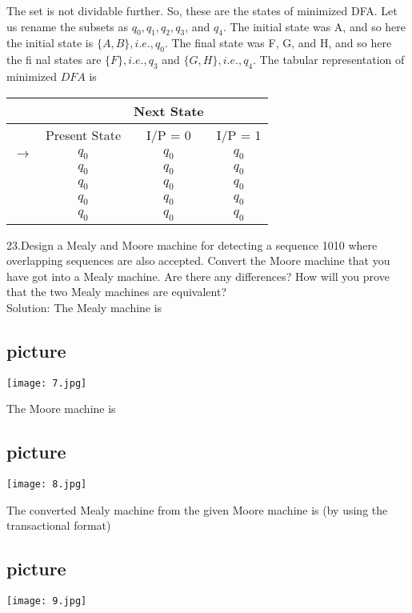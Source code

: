 \documentclass{article}
\begin{document}
The set is not dividable further. So, these are the states of minimized DFA. Let us rename the subsets as $q_0, q_1, q_2, q_3$, and $q_4$. The initial state was A, and so here the initial state is $\{A, B\}, i.e., q_0$. The ﬁnal state was F, G, and H, and so here the ﬁ nal states are $\{F\}, i.e., q_3$ and $\{G, H\}, i.e., q_4$. The tabular representation of minimized $DFA$ is
\\

\begin{center}

	\begin{tabular}{rccc}
		\hline
		&&Next State\\
		\hline
		&Present State&I/P = 0&I/P = 1\\
		\hline
		$\rightarrow$&$q_{0}$&$q_{0}$&$q_{0}$\\
		&$q_{0}$&$q_{0}$&$q_{0}$\\
		&$q_{0}$&$q_{0}$&$q_{0}$\\
		&$q_{0}$&$q_{0}$&$q_{0}$\\
		&$q_{0}$&$q_{0}$&$q_{0}$\\
		\hline
	\end{tabular}
\end{center}

23.Design a Mealy and Moore machine for detecting a sequence 1010 where overlapping sequences are also accepted. Convert the Moore machine that you have got into a Mealy machine. Are there any differences? How will you prove that the two Mealy machines are equivalent?\\
Solution: The Mealy machine is\\

\begin{center}
\section{picture}
\texttt{[image: 7.jpg]}
\end{center}


The Moore machine is\\
\begin{center}
\section{picture}
\texttt{[image: 8.jpg]}
\end{center}

The converted Mealy machine from the given Moore machine is (by using the transactional format)\\
\begin{center}
\section{picture}
\texttt{[image: 9.jpg]}
\end{center}
\end{document}
